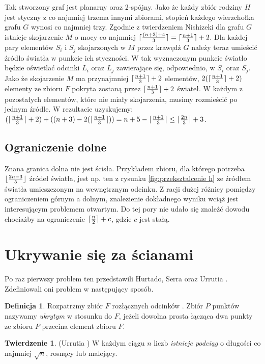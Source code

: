 \documentclass[brudnopis]{xmgr}
\DeclarePairedDelimiter\ceil{\lceil}{\rceil}
\DeclarePairedDelimiter\floor{\lfloor}{\rfloor}
\theoremstyle{definition}
\newtheorem{Twierdzenie}{Twierdzenie}
\newtheorem{Definicja}{Definicja}
\begin{document}
Tak stworzony graf jest planarny oraz 2-spójny. Jako że każdy zbiór rodziny $H$ jest styczny z co najmniej trzema innymi zbiorami, stopień każdego wierzchołka grafu $G$ wynosi co najmniej trzy. Zgodnie z twierdzeniem Nishizeki \cite{nishizeki} dla grafu $G$ istnieje skojarzenie $M$ o mocy co najmniej $\ceil{\frac{(n+3)+4}{3}} = \ceil{\frac{n+1}{3}}  + 2$. Dla każdej pary elementów $S_i$ i $S_j$ skojarzonych w $M$ przez krawędź $G$ należy teraz umieścić źródło światła w punkcie ich styczności. W tak wyznaczonym punkcie światło będzie oświetlać odcinki $L_i$ oraz $L_j$ zawierające się, odpowiednio, w $S_i$ oraz $S_j$. Jako że skojarzenie $M$ ma przynajmniej $\ceil{\frac{n+1}{3}} + 2$ elementów, $2(\ceil{\frac{n+1}{3}} + 2)$ elementy ze zbioru $F$ pokryta zostaną przez $\ceil{\frac{n+1}{3}} + 2$ świateł. W każdym z pozostałych elementów, które nie miały skojarzenia, musimy rozmieścić po jednym źródle. W rezultacie uzyskujemy:
$(\ceil{\frac{n+1}{3}} + 2) + ((n + 3) - 2(\ceil{\frac{n+1}{3}})) = n + 5 - \ceil{\frac{n+1}{3}} \le \ceil{\frac{2n}{3}} + 3$.

\subsection{Ograniczenie dolne}
\indent Znana granica dolna nie jest ścisła. Przykładem zbioru, dla którego potrzeba $\floor{\frac{2n-3}{5}}$ źródeł światła, jest np. ten z rysunku \ref{fig:przeksztalcenie h} ze źródłem światła umieszczonym na wewnętrznym odcinku. Z racji dużej różnicy pomiędzy ograniczeniem górnym a dolnym, znalezienie dokładnego wyniku wciąż jest interesującym problemem otwartym. Do tej pory nie udało się znaleźć dowodu chociażby na ograniczenie $\ceil{\frac{n}{2}} + c$, gdzie $c$ jest stałą.

\section{Ukrywanie się za ścianami}
Po raz pierwszy problem ten przedstawili Hurtado, Serra oraz Urrutia \cite{sciany}. Zdefiniowali oni problem w następujący sposób.

\begin{Definicja}\label{ukrywanie definicja}
 Rozpatrzmy zbiór $F$ rozłącznych odcinków . Zbiór $P$ punktów nazywamy \emph{ukrytym} w stosunku do $F$, jeżeli dowolna prosta łącząca dwa punkty ze zbioru $P$ przecina element zbioru $F$.
\end{Definicja}

\begin{Twierdzenie}\label{podciag rosnacy} (Urrutia \cite{illumination})
  W każdym ciągu $n$ liczb \emph{istnieje podciąg} o długości co najmniej $\sqrt{n}$, rosnący lub malejący.
\end{Twierdzenie}
\end{document}
